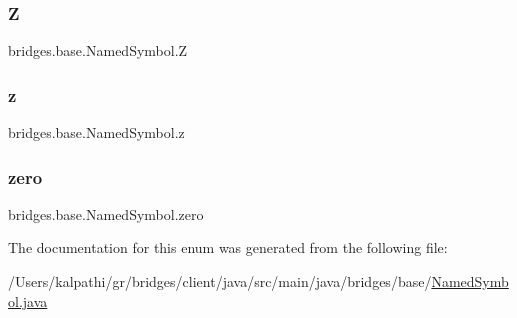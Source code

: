 \subsubsection{\texorpdfstring{Z}{Z}}
{\footnotesize\ttfamily bridges.\+base.\+Named\+Symbol.\+Z}

\mbox{\label{enumbridges_1_1base_1_1_named_symbol_afd675b395e85e5dd4329d7586be20fdf}} 
\subsubsection{\texorpdfstring{z}{z}}
{\footnotesize\ttfamily bridges.\+base.\+Named\+Symbol.\+z}

\mbox{\label{enumbridges_1_1base_1_1_named_symbol_a3db51a591e688df96b707c28a7b03ae4}} 
\subsubsection{\texorpdfstring{zero}{zero}}
{\footnotesize\ttfamily bridges.\+base.\+Named\+Symbol.\+zero}



The documentation for this enum was generated from the following file\+:\begin{DoxyCompactItemize}
\item 
/\+Users/kalpathi/gr/bridges/client/java/src/main/java/bridges/base/\mbox{\hyperlink{_named_symbol_8java}{Named\+Symbol.\+java}}\end{DoxyCompactItemize}
